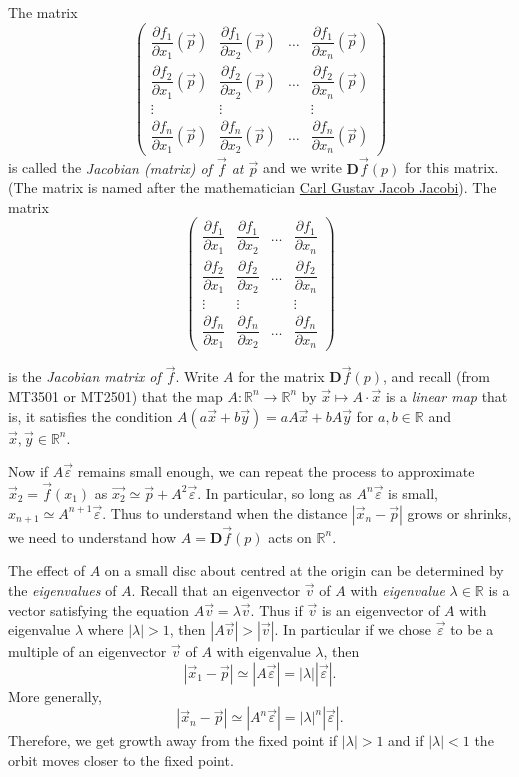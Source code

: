 \documentclass[
  a4paper,
  oneside,
  final]{krantz}
\newcommand{\R}{\mathbb{R}}
\renewcommand{\epsilon}{\varepsilon}
\newcommand{\pder}[2]{\dfrac{\partial #1}{\partial#2}}
\newcommand{\jacob}{{\mathbf{D}}\vec{f}}
\theoremstyle{definition}
\theoremstyle{definition}
\theoremstyle{definition}
\theoremstyle{definition}
\theoremstyle{remark}
\begin{document}
The matrix
\[\begin{pmatrix}
                            \pder{f_1}{x_1}(\vec{p}) & \pder{f_1}{x_2}(\vec{p}) & \ldots & \pder{f_1}{x_n}(\vec{p}) \\
                            \pder{f_2}{x_1}(\vec{p}) & \pder{f_2}{x_2}(\vec{p}) & \ldots & \pder{f_2}{x_n}(\vec{p}) \\
                            \vdots & \vdots & & \vdots \\
                            \pder{f_n}{x_1}(\vec{p}) & \pder{f_n}{x_2}(\vec{p}) & \ldots & \pder{f_n}{x_n}(\vec{p})                            
\end{pmatrix}\]
is called the \emph{Jacobian (matrix) of \(\vec{f}\) at \(\vec{p}\)} and we write \(\jacob(p)\) for this matrix. (The matrix is named after the mathematician \href{https://mathhistory.st-andrews.ac.uk/Biographies/Jacobi/}{Carl Gustav Jacob Jacobi}). The matrix
\[\begin{pmatrix}
                            \pder{f_1}{x_1} & \pder{f_1}{x_2} & \ldots & \pder{f_1}{x_n} \\
                            \pder{f_2}{x_1} & \pder{f_2}{x_2}& \ldots & \pder{f_2}{x_n} \\
                            \vdots & \vdots & & \vdots \\
                            \pder{f_n}{x_1} & \pder{f_n}{x_2} & \ldots & \pder{f_n}{x_n}                           
\end{pmatrix}\]

is the \emph{Jacobian matrix of \(\vec{f}\)}. Write \(A\) for the matrix \(\jacob(p)\), and recall (from MT3501 or MT2501) that the map \(A: \R^{n} \to \R^{n}\) by \(\vec{x} \mapsto A \cdot \vec{x}\) is a \emph{linear map} that is, it satisfies the condition \(A(a \vec{x} + b \vec{y}) = aA\vec{x} + b A\vec{y}\) for \(a,b \in \R\) and \(\vec{x}, \vec{y} \in \R^{n}\).

Now if \(A\vec{\epsilon}\) remains small enough, we can repeat the process to approximate \(\vec{x}_2 = \vec{f}(x_1)\) as \(\vec{x_2} \simeq \vec{p} + A^2\vec{\epsilon}\). In particular, so long as \(A^{n}\vec{\epsilon}\) is small, \(x_{n+1} \simeq A^{n+1}\vec{\epsilon}\). Thus to understand when the distance \(|\vec{x}_{n} - \vec{p}|\) grows or shrinks, we need to understand how \(A=\jacob(p)\) acts on \(\R^{n}\).

The effect of \(A\) on a small disc about centred at the origin can be determined by the \emph{eigenvalues} of \(A\). Recall that an eigenvector \(\vec{v}\) of \(A\) with \emph{eigenvalue} \(\lambda \in \R\) is a vector satisfying the equation \(A\vec{v} = \lambda \vec{v}\). Thus if \(\vec{v}\) is an eigenvector of \(A\) with eigenvalue \(\lambda\) where \(|\lambda|>1\), then \(|A\vec{v}| > |\vec{v}|\). In particular if we chose \(\vec{\epsilon}\) to be a multiple of an eigenvector \(\vec{v}\) of \(A\) with eigenvalue \(\lambda\), then \[|\vec{x}_1 - \vec{p}| \simeq |A \vec{\epsilon}| = |\lambda| |\vec{\epsilon}|.\] More generally, \[|\vec{x}_{n} -\vec{p}| \simeq |A^{n} \vec{\epsilon}| = |\lambda|^{n} |\vec{\epsilon}|.\] Therefore, we get growth away from the fixed point if \(|\lambda|>1\) and if \(|\lambda|<1\) the orbit moves closer to the fixed point.
\end{document}
